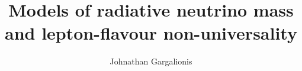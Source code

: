 \title{Models of radiative neutrino mass and lepton-flavour non-universality}

\author{Johnathan Gargalionis}



